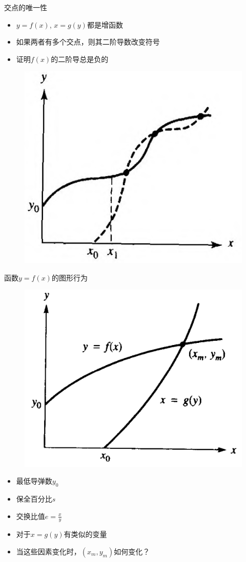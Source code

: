 \documentclass[mathserif, table]{beamer}
\begin{document}
\begin{frame}{交点的唯一性}
  \begin{itemize}
  \item $y=f(x)$, $x=g(y)$都是增函数
  \item 如果两者有多个交点，则其二阶导数改变符号
  \item 证明$f(x)$的二阶导总是负的
  \end{itemize}

  \begin{figure}
    \centering
    \includegraphics[width=.5\textwidth]{neg.png}
  \end{figure}
  
\end{frame}

\begin{frame}{函数$y=f(x)$的图形行为}

  \begin{figure}
    \centering
    \includegraphics[width=.4\textwidth]{model.png}
  \end{figure}
  
  \begin{itemize}
  \item 最低导弹数$y_0$
  \item 保全百分比$s$
  \item 交换比值$e = \frac{x}{y}$
  \item 对于$x=g(y)$有类似的变量
  \item 当这些因素变化时，$(x_m, y_m)$如何变化？
  \end{itemize}
  
\end{frame}
\end{document}
